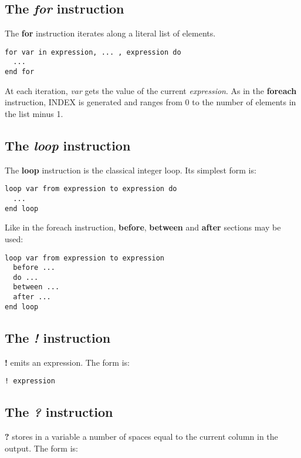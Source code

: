 \subsection{The {\em for} instruction}

The {\bf for} instruction iterates along a literal list of elements.

\begin{lstlisting}
for var in expression, ... , expression do
  ...
end for
\end{lstlisting}

At each iteration, {\em var} gets the value of the current {\em expression}. As in the {\bf foreach} instruction, INDEX is generated and ranges from 0 to the number of elements in the list minus 1.

\subsection{The {\em loop} instruction}

The {\bf loop} instruction is the classical integer loop. Its simplest form is:

\begin{lstlisting}
loop var from expression to expression do
  ...
end loop
\end{lstlisting}

Like in the foreach instruction, {\bf before},  {\bf between} and  {\bf after} sections may be used:

\begin{lstlisting}
loop var from expression to expression
  before ...
  do ...
  between ...
  after ...
end loop
\end{lstlisting}


\subsection{The {\em !} instruction}
\label{outputInstruction}

{\bf !} emits an expression. The form is:

\begin{lstlisting}
! expression
\end{lstlisting}

\subsection{The {\em ?} instruction}

{\bf ?} stores in a variable a number of spaces equal to the current column in the output. The form is:

